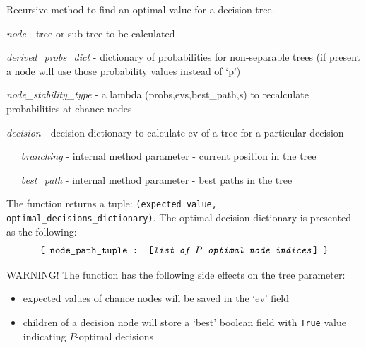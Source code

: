 \documentclass[a4paper,10pt,english]{sphinxmanual}
\begin{document}

\begin{fulllineitems}
	\label{index:chondro.solve_tree}
	Recursive method to find an optimal value for a decision tree.
	
	\emph{node} - tree or sub-tree to be calculated
	
	\emph{derived\_probs\_dict} - dictionary of probabilities for non-separable trees
	(if present a node will use those probability values instead of `p')
	
	\emph{node\_stability\_type} - a lambda (probs,evs,best\_path,s) to recalculate     probabilities at chance nodes
	
	\emph{decision} - decision dictionary to calculate ev of a tree for     a particular decision
	
	\emph{\_\_branching} - internal method parameter - current position in the tree
	
	\emph{\_\_best\_path} - internal method parameter - best paths in the tree
	
	The function returns a tuple: \texttt{(expected\_value, optimal\_decisions\_dictionary)}. The optimal decision dictionary is presented as the following: 
	\begin{equation*}
		 \texttt{\{ node\_path\_tuple : [\textit{list of $P$-optimal node indices}] \}}
		\end{equation*}
	
	WARNING! The function has the following side effects on the tree parameter:
	\begin{itemize}
		\item expected values of chance nodes will be saved in the `ev' field
		
		\item children of a decision node will store a `best' boolean field with \texttt{True} value indicating $P$-optimal decisions
		
	\end{itemize}
	
\end{fulllineitems}

\end{document}
